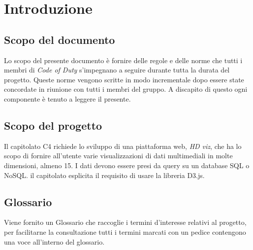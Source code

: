 \section{Introduzione}
    \subsection{Scopo del documento}
    Lo scopo del presente documento è fornire delle regole e delle norme che tutti i membri di \textit{Code of Duty} s'impegnano a seguire durante tutta la durata del progetto. Queste norme vengono scritte in modo incrementale dopo essere state concordate in riunione con tutti i membri del gruppo.
    A discapito di questo ogni componente è tenuto a leggere il presente.
    \subsection{Scopo del progetto}
    Il capitolato C4 richiede lo sviluppo di una piattaforma web, \textit{HD viz}, che ha lo scopo di fornire all'utente varie visualizzazioni di dati multimediali in molte dimensioni, almeno 15. I dati devono essere presi da query su un database SQL o NoSQL. il capitolato esplicita il requisito di usare la libreria D3.js.
    \subsection{Glossario}
    Viene fornito un Glossario che raccoglie i termini d'interesse relativi al progetto, per facilitarne la consultazione tutti i termini marcati con un pedice \glo{} contengono una voce all'interno del glossario.
